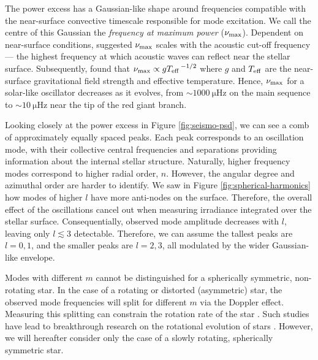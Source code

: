 The power excess has a Gaussian-like shape around frequencies compatible with the near-surface convective timescale responsible for mode excitation. We call the centre of this Gaussian the \emph{frequency at maximum power} (\({\nu_\mathrm{max}}\)). Dependent on near-surface conditions, \citet{Brown.Gilliland.ea1991} suggested \({\nu_\mathrm{max}}\) scales with the acoustic cut-off frequency --- the highest frequency at which acoustic waves can reflect near the stellar surface. Subsequently, \citet{Kjeldsen.Bedding1995} found that \({\nu_\mathrm{max}} \propto g{T_\mathrm{eff}}^{\,-1/2}\) where \(g\) and \({T_\mathrm{eff}}\) are the near-surface gravitational field strength and effective temperature. Hence, \({\nu_\mathrm{max}}\) for a solar-like oscillator decreases as it evolves, from \(\sim \SI{1000}{\micro\hertz}\) on the main sequence to \(\sim \SI{10}{\micro\hertz}\) near the tip of the red giant branch.

Looking closely at the power excess in Figure \ref{fig:seismo-psd}, we can see a comb of approximately equally spaced peaks. Each peak corresponds to an oscillation mode, with their collective central frequencies and separations providing information about the internal stellar structure. Naturally, higher frequency modes correspond to higher radial order, \(n\). However, the angular degree and azimuthal order are harder to identify. We saw in Figure \ref{fig:spherical-harmonics} how modes of higher \(l\) have more anti-nodes on the surface. Therefore, the overall effect of the oscillations cancel out when measuring irradiance integrated over the stellar surface. Consequentially, observed mode amplitude decreases with \(l\), leaving only \(l \lesssim 3\) detectable. 
Therefore, we can assume the tallest peaks are \(l=0,1\), and the smaller peaks are \(l=2,3\), all modulated by the wider Gaussian-like envelope.

Modes with different \(m\) cannot be distinguished for a spherically symmetric, non-rotating star. In the case of a rotating or distorted (asymmetric) star, the observed mode frequencies will split for different \(m\) via the Doppler effect. Measuring this splitting can constrain the rotation rate of the star \citep[e.g.][]{Davies.Chaplin.ea2015,Garcia.Ceillier.ea2014,Deheuvels.Garcia.ea2012}. Such studies have lead to breakthrough research on the rotational evolution of stars \citep[e.g.][]{Angus.Aigrain.ea2015,Hall.Davies.ea2021,vanSaders.Ceillier.ea2016}. However, we will hereafter consider only the case of a slowly rotating, spherically symmetric star.

